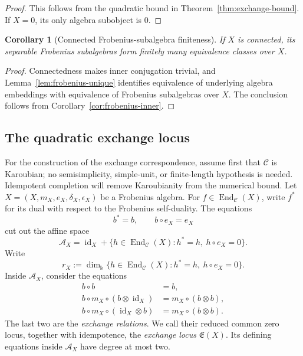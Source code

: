 \documentclass[11pt]{amsart}
\newtheorem{corollary}[theorem]{Corollary}
\theoremstyle{definition}
\theoremstyle{remark}
\newcommand{\C}{\mathcal C}
\newcommand{\kk}{\Bbbk}
\newcommand{\Exch}{\mathfrak E}
\DeclareMathOperator{\End}{End}
\DeclareMathOperator{\id}{id}
\begin{document}
\begin{proof}
This follows from the quadratic bound in
Theorem~\ref{thm:exchange-bound}.  If $X=0$, its only algebra subobject is $0$.
\end{proof}

\begin{corollary}[Connected Frobenius-subalgebra finiteness]
\label{cor:frobenius}
If $X$ is connected, its separable Frobenius subalgebras form finitely
many equivalence classes over $X$.
\end{corollary}

\begin{proof}
Connectedness makes inner conjugation trivial, and
Lemma~\ref{lem:frobenius-unique} identifies equivalence of underlying
algebra embeddings with equivalence of Frobenius subalgebras over $X$.
The conclusion follows from Corollary~\ref{cor:frobenius-inner}.
\end{proof}

\subsection{The quadratic exchange locus}

For the construction of the exchange correspondence, assume first that
$\C$ is Karoubian; no semisimplicity, simple-unit, or finite-length
hypothesis is needed.  Idempotent completion will remove Karoubianity
from the numerical bound.
Let $X=(X,m_X,e_X,\delta_X,\epsilon_X)$ be a Frobenius algebra.
For $f\in\End_{\C}(X)$, write $f^*$ for its dual with respect to the
Frobenius self-duality.  The equations
\[
 b^*=b,\qquad b\circ e_X=e_X
\]
cut out the affine space
\begin{equation}\label{eq:affine-self-dual}
 \mathscr A_X
 =\id_X+\{h\in\End_{\C}(X):h^*=h,\ h\circ e_X=0\}.
\end{equation}
Write
\begin{equation}\label{eq:rX}
 r_X:=\dim_{\kk}\{h\in\End_{\C}(X):h^*=h,\ h\circ e_X=0\}.
\end{equation}
Inside $\mathscr A_X$, consider the equations
\begin{equation}\label{eq:exchange-locus}
\begin{aligned}
 b\circ b&=b,\\
 b\circ m_X\circ(b\otimes\id_X)&=m_X\circ(b\otimes b),\\
 b\circ m_X\circ(\id_X\otimes b)&=m_X\circ(b\otimes b).
\end{aligned}
\end{equation}
The last two are the \emph{exchange relations}.  We call their reduced
common zero locus, together with idempotence, the \emph{exchange locus}
$\Exch(X)$.  Its defining equations inside $\mathscr A_X$ have degree at
most two.
\end{document}
